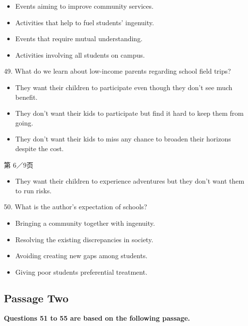 \documentclass[UTF8,11pt]{ctexart}
\begin{document}
\begin{itemize}[leftmargin=2em,itemsep=.2em,topsep=.4em]\item[A.] Events aiming to improve community services.
\item[B.] Activities that help to fuel students' ingenuity.
\item[C.] Events that require mutual understanding.
\item[D.] Activities involving all students on campus.
\end{itemize}

49. What do we learn about low-income parents regarding school field trips?


\begin{itemize}[leftmargin=2em,itemsep=.2em,topsep=.4em]\item[A.] They want their children to participate even though they don't see much benefit.
\item[B.] They don't want their kids to participate but find it hard to keep them from going.
\item[C.] They don't want their kids to miss any chance to broaden their horizons despite the cost.
\end{itemize}

第 6／9页


\begin{itemize}[leftmargin=2em,itemsep=.2em,topsep=.4em]\item[D.] They want their children to experience adventures but they don't want them to run risks.
\end{itemize}

50. What is the author's expectation of schools?


\begin{itemize}[leftmargin=2em,itemsep=.2em,topsep=.4em]\item[A.] Bringing a community together with ingenuity.
\item[B.] Resolving the existing discrepancies in society.
\item[C.] Avoiding creating new gaps among students.
\item[D.] Giving poor students preferential treatment.
\end{itemize}

\subsection*{\textbf{Passage Two}}


\textbf{Questions 51 to 55 are based on the following passage.}
\end{document}
